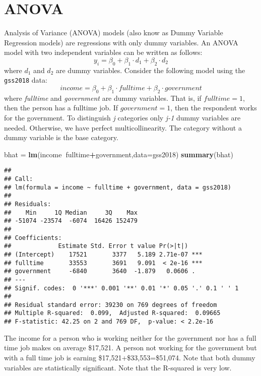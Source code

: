 \documentclass[
]{article}
\newenvironment{Shaded}{\begin{snugshade}}{\end{snugshade}}
\newcommand{\DataTypeTok}[1]{\textcolor[rgb]{0.13,0.29,0.53}{#1}}
\newcommand{\KeywordTok}[1]{\textcolor[rgb]{0.13,0.29,0.53}{\textbf{#1}}}
\newcommand{\NormalTok}[1]{#1}
\newcommand{\OperatorTok}[1]{\textcolor[rgb]{0.81,0.36,0.00}{\textbf{#1}}}
\newcommand{\StringTok}[1]{\textcolor[rgb]{0.31,0.60,0.02}{#1}}
\begin{document}
\hypertarget{anova}{%
\section{ANOVA}\label{anova}}

Analysis of Variance (ANOVA) models (also know as Dummy Variable Regression models) are regressions with only dummy variables. An ANOVA model with two independent variables can be written as follows:
\[y_i = \beta_0 + \beta_1 \cdot d_1 + \beta_2 \cdot d_2\]
where \(d_1\) and \(d_2\) are dummy variables. Consider the following model using the \texttt{gss2018} data:
\[income = \beta_0 + \beta_1 \cdot fulltime + \beta_2 \cdot government\]
where \emph{fulltime} and \emph{government} are dummy variables. That is, if \(fulltime=1\), then the person has a fulltime job. If \(government=1\), then the respondent works for the government. To distinguish \emph{j} categories only \emph{j-1} dummy variables are needed. Otherwise, we have perfect multicollinearity. The category without a dummy variable is the base category.

\begin{Shaded}
\begin{Highlighting}[]
\NormalTok{bhat =}\StringTok{ }\KeywordTok{lm}\NormalTok{(income}\OperatorTok{~}\NormalTok{fulltime}\OperatorTok{+}\NormalTok{government,}\DataTypeTok{data=}\NormalTok{gss2018)}
\KeywordTok{summary}\NormalTok{(bhat)}
\end{Highlighting}
\end{Shaded}

\begin{verbatim}
## 
## Call:
## lm(formula = income ~ fulltime + government, data = gss2018)
## 
## Residuals:
##    Min     1Q Median     3Q    Max 
## -51074 -23574  -6074  16426 152479 
## 
## Coefficients:
##             Estimate Std. Error t value Pr(>|t|)    
## (Intercept)    17521       3377   5.189 2.71e-07 ***
## fulltime       33553       3691   9.091  < 2e-16 ***
## government     -6840       3640  -1.879   0.0606 .  
## ---
## Signif. codes:  0 '***' 0.001 '**' 0.01 '*' 0.05 '.' 0.1 ' ' 1
## 
## Residual standard error: 39230 on 769 degrees of freedom
## Multiple R-squared:  0.099,  Adjusted R-squared:  0.09665 
## F-statistic: 42.25 on 2 and 769 DF,  p-value: < 2.2e-16
\end{verbatim}

The income for a person who is working neither for the government nor has a full time job makes on average \$17,521. A person not working for the government but with a full time job is earning \$17,521+\$33,553=\$51,074. Note that both dummy variables are statistically significant. Note that the R-squared is very low.
\end{document}
